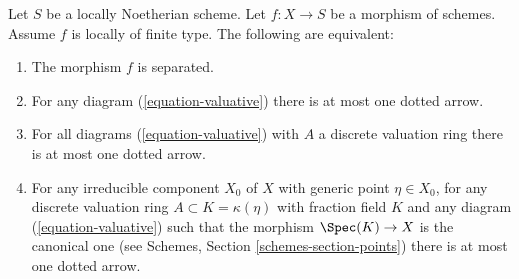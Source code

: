 %
\begin{lemma}
\label{lemma-Noetherian-dvr-valuative-separation}
Let $S$ be a locally Noetherian scheme.
Let $f : X \to S$ be a morphism of schemes.
Assume $f$ is locally of finite type.
The following are equivalent:
\begin{enumerate}
\item The morphism $f$ is separated.
\item For any diagram (\ref{equation-valuative}) there is at most
one dotted arrow.
\item For all diagrams (\ref{equation-valuative}) with $A$ a discrete
valuation ring there is at most one dotted arrow.
\item For any irreducible component $X_0$ of $X$ with
generic point $\eta \in X_0$, for any discrete valuation ring
$A \subset K = \kappa(\eta)$ with fraction field $K$ and any
diagram (\ref{equation-valuative}) such that
the morphism $\Spec(K) \to X$ is the canonical one
(see Schemes, Section \ref{schemes-section-points})
there is at most one dotted arrow.
\end{enumerate}
\end{lemma}

